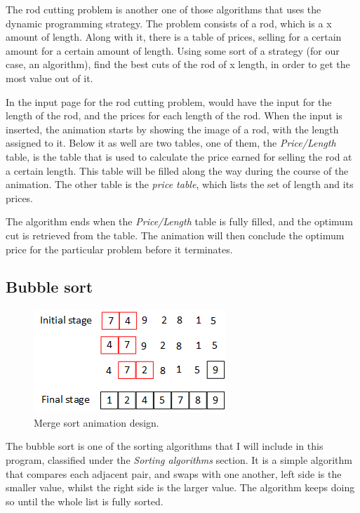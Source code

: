 The rod cutting problem is another one of those algorithms that uses the dynamic programming strategy. The problem consists of a rod, which is a x amount of length. Along with it, there is a table of prices, selling for a certain amount for a certain amount of length. Using some sort of a strategy (for our case, an algorithm), find the best cuts of the rod of x length, in order to get the most value out of it.

In the input page for the rod cutting problem, would have the input for the length of the rod, and the prices for each length of the rod. When the input is inserted, the animation starts by showing the image of a rod, with the length assigned to it. Below it as well are two tables, one of them, the \textit{Price/Length} table, is the table that is used to calculate the price earned for selling the rod at a certain length. This table will be filled along the way during the course of the animation. The other table is the \textit{price table}, which lists the set of length and its prices. 

The algorithm ends when the \textit{Price/Length} table is fully filled, and the optimum cut is retrieved from the table. The animation will then conclude the optimum price for the particular problem before it terminates.

\subsection{Bubble sort}

\begin{figure}[H]
\centering
\includegraphics[scale=1.5]{images/report_images/animationDesignBubbleSort.png}
\caption{Merge sort animation design.}
\label{animationDesignBubbleSort}
\end{figure}

The bubble sort is one of the sorting algorithms that I will include in this program, classified under the \textit{Sorting algorithms} section. It is a simple algorithm that compares each adjacent pair, and swaps with one another, left side is the smaller value, whilst the right side is the larger value. The algorithm keeps doing so until the whole list is fully sorted.

